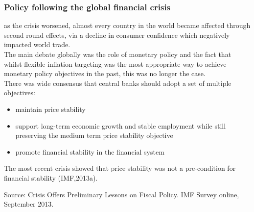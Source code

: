 \documentclass[11pt]{beamer}
\begin{document}

\begin{frame}
\frametitle{Policy following the global financial crisis}
as the crisis worsened, almost every country in the world became affected through second round effects, via a decline in consumer confidence which negatively impacted world trade. \\
The main debate globally was the role of monetary policy and the fact that whilst flexible inflation targeting was the most appropriate way to achieve monetary policy objectives in the past, this was no longer the case. \\
There was wide consensus that central banks should adopt a set of multiple objectives:
\begin{itemize}
\item maintain price stability
\item support long-term economic growth and stable employment while still preserving the medium term price stability objective
\item promote financial stability in the financial system
\end{itemize}
\end{frame}

\begin{frame}
\begin{center}
The most recent crisis showed that price stability was not a pre-condition for financial stability (IMF,2013a).
\end{center}
\tiny{Source: Crisis Offers Preliminary Lessons on Fiscal
Policy. IMF Survey online, September 2013.}
\end{frame}





\end{document}
